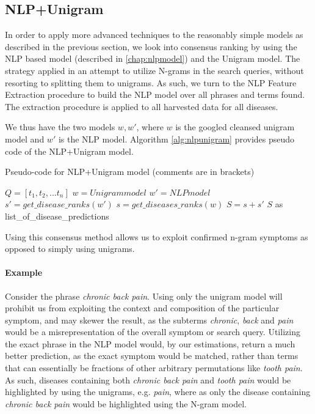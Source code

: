 \documentclass[10pt,letterpaper,final]{article}
\begin{document}
\subsection{NLP+Unigram}
In order to apply more advanced techniques to the reasonably simple
models as described in the previous section, we look into consensus
ranking by using the NLP based model (described in \ref{chap:nlpmodel}) and the Unigram model.
The strategy applied in an attempt to utilize N-grams in the search
queries, without resorting to splitting them to unigrams. As such, we
turn to the NLP Feature Extraction procedure to build the NLP model over
all phrases and terms found. The extraction procedure is applied to
all harvested data for all diseases.

We thus have the two models $w, w'$, where $w$ is the googled cleansed
unigram model and $w'$ is the NLP model. Algorithm \ref{alg:nlpunigram} provides pseudo code of the NLP+Unigram
model.

\begin{algorithm}
\caption{Pseudo-code for NLP+Unigram model (comments are in brackets)}
\begin{algorithmic}

\STATE $Q=[t_{1}, t_{2}, ... t_{n}]$ 
\STATE $w = Unigram model$
\STATE $w' = NLP model$
        \STATE $s' = get\_disease\_ranks(w')$ 
    \ELSE
        \STATE $s = get\_diseases\_ranks(w)$
    \ENDIF
    \STATE $S = s + s'$
\ENDFOR
\RETURN $S$ as list\_of\_disease\_predictions

\end{algorithmic}
\label{alg:nlpunigram}
\end{algorithm}

Using this consensus method allows us to exploit confirmed n-gram
symptoms as opposed to simply using unigrams.

\paragraph{Example} Consider the phrase \textit{chronic back pain}.
Using only the unigram model will prohibit us from exploiting the
context and composition of the particular symptom, and may skewer the
result, as the subterms \textit{chronic}, \textit{back} and
\textit{pain} would be a misrepresentation of the overall symptom or
search query. Utilizing the exact phrase in the NLP model would, by
our estimations, return a much better prediction, as the exact symptom
would be matched, rather than terms that can essentially be fractions of
other arbitrary permutations like \textit{tooth pain}. As such, diseases
containing both \textit{chronic back pain} and \textit{tooth pain} would
be highlighted by using the unigrams, e.g. \textit{pain}, where as only
the disease containing \textit{chronic back pain} would be highlighted
using the N-gram model. \newline
\end{document}
